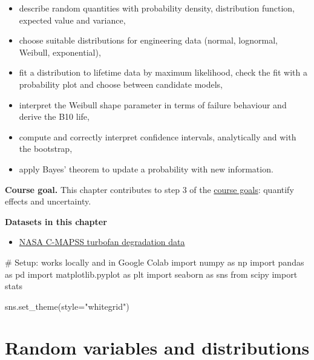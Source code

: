 \documentclass[
  letterpaper,
  DIV=11,
  numbers=noendperiod]{scrreprt}
\newenvironment{Shaded}{\begin{snugshade}}{\end{snugshade}}
\newcommand{\CommentTok}[1]{\textcolor[rgb]{0.37,0.37,0.37}{#1}}
\newcommand{\ImportTok}[1]{\textcolor[rgb]{0.00,0.46,0.62}{#1}}
\newcommand{\NormalTok}[1]{\textcolor[rgb]{0.00,0.23,0.31}{#1}}
\newcommand{\OperatorTok}[1]{\textcolor[rgb]{0.37,0.37,0.37}{#1}}
\newcommand{\StringTok}[1]{\textcolor[rgb]{0.13,0.47,0.30}{#1}}
\providecommand{\tightlist}{%
  \setlength{\itemsep}{0pt}\setlength{\parskip}{0pt}}\usepackage{longtable,booktabs,array}
\begin{document}
\begin{itemize}
\tightlist
\item
  describe random quantities with probability density, distribution
  function, expected value and variance,
\item
  choose suitable distributions for engineering data (normal, lognormal,
  Weibull, exponential),
\item
  fit a distribution to lifetime data by maximum likelihood, check the
  fit with a probability plot and choose between candidate models,
\item
  interpret the Weibull shape parameter in terms of failure behaviour
  and derive the B10 life,
\item
  compute and correctly interpret confidence intervals, analytically and
  with the bootstrap,
\item
  apply Bayes' theorem to update a probability with new information.
\end{itemize}

\textbf{Course goal.} This chapter contributes to step 3 of the
\hyperref[what-you-will-be-able-to-do]{course goals}: quantify effects
and uncertainty.

\textbf{Datasets in this chapter}

\begin{itemize}
\tightlist
\item
  \href{https://data.nasa.gov/dataset/cmapss-jet-engine-simulated-data}{NASA
  C-MAPSS turbofan degradation data}
\end{itemize}

\begin{Shaded}
\begin{Highlighting}[]
\CommentTok{\# Setup: works locally and in Google Colab}
\ImportTok{import}\NormalTok{ numpy }\ImportTok{as}\NormalTok{ np}
\ImportTok{import}\NormalTok{ pandas }\ImportTok{as}\NormalTok{ pd}
\ImportTok{import}\NormalTok{ matplotlib.pyplot }\ImportTok{as}\NormalTok{ plt}
\ImportTok{import}\NormalTok{ seaborn }\ImportTok{as}\NormalTok{ sns}
\ImportTok{from}\NormalTok{ scipy }\ImportTok{import}\NormalTok{ stats}

\NormalTok{sns.set\_theme(style}\OperatorTok{=}\StringTok{"whitegrid"}\NormalTok{)}
\end{Highlighting}
\end{Shaded}

\section{Random variables and
distributions}\label{random-variables-and-distributions}
\end{document}
